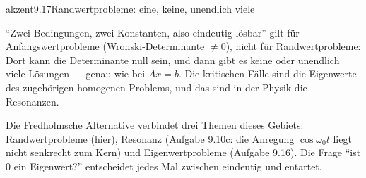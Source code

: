 \begin{loesungkarte}{akzent}{9.17}{Randwertprobleme: eine, keine, unendlich viele}
\begin{fehler}\kastentext
\enquote{Zwei Bedingungen, zwei Konstanten, also eindeutig lösbar} gilt für Anfangswertprobleme (Wronski-Determinante $\neq0$), nicht für Randwertprobleme: Dort kann die Determinante null sein, und dann gibt es keine oder unendlich viele Lösungen --- genau wie bei $Ax = b$. Die kritischen Fälle sind die Eigenwerte des zugehörigen homogenen Problems, und das sind in der Physik die Resonanzen.
\end{fehler}
\begin{mitnehmen}\kastentext
Die Fredholmsche Alternative verbindet drei Themen dieses Gebiets: Randwertprobleme (hier), Resonanz (Aufgabe 9.10c: die Anregung $\cos\omega_0t$ liegt nicht senkrecht zum Kern) und Eigenwertprobleme (Aufgabe 9.16). Die Frage \enquote{ist $0$ ein Eigenwert?} entscheidet jedes Mal zwischen eindeutig und entartet.
\end{mitnehmen}
\end{loesungkarte}

